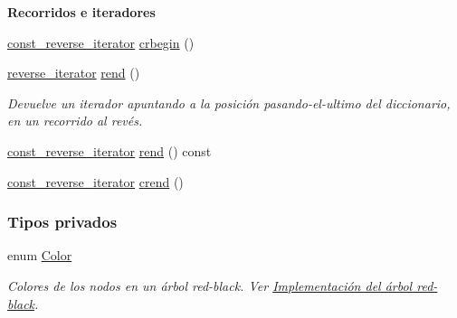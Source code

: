 \begin{Indent}{\bf Recorridos e iteradores}
\begin{DoxyCompactItemize}
\item 
\hyperlink{classaed2_1_1map_aed66a216549d13078a3ea6978ea0b768_aed66a216549d13078a3ea6978ea0b768}{const\-\_\-reverse\-\_\-iterator} \hyperlink{classaed2_1_1map_a6ad62765a2b2e00247b9e35a7542b448_a6ad62765a2b2e00247b9e35a7542b448}{crbegin} ()
\item 
\hyperlink{classaed2_1_1map_a8e6a592062260177fd73b2f9897b1dd5_a8e6a592062260177fd73b2f9897b1dd5}{reverse\-\_\-iterator} \hyperlink{classaed2_1_1map_a277f03b4f4b6b98879e4e4921081801f_a277f03b4f4b6b98879e4e4921081801f}{rend} ()
\begin{DoxyCompactList}\small\item\em Devuelve un iterador apuntando a la posición pasando-\/el-\/ultimo del diccionario, en un recorrido al revés. \end{DoxyCompactList}\item 
\hyperlink{classaed2_1_1map_aed66a216549d13078a3ea6978ea0b768_aed66a216549d13078a3ea6978ea0b768}{const\-\_\-reverse\-\_\-iterator} \hyperlink{classaed2_1_1map_aafce6e53c53c460897613747fec89f9d_aafce6e53c53c460897613747fec89f9d}{rend} () const 
\item 
\hyperlink{classaed2_1_1map_aed66a216549d13078a3ea6978ea0b768_aed66a216549d13078a3ea6978ea0b768}{const\-\_\-reverse\-\_\-iterator} \hyperlink{classaed2_1_1map_a40933b2efe1cb479de9195ea947244d1_a40933b2efe1cb479de9195ea947244d1}{crend} ()
\end{DoxyCompactItemize}
\end{Indent}
\subsubsection*{Tipos privados}
\begin{DoxyCompactItemize}
\item 
enum \hyperlink{classaed2_1_1map_a6d62a415a4b9d320b30cada4ebcf9f5b_a6d62a415a4b9d320b30cada4ebcf9f5b}{Color} 
\begin{DoxyCompactList}\small\item\em Colores de los nodos en un árbol red-\/black. Ver \hyperlink{Implementacion}{Implementación del árbol red-\/black}. \end{DoxyCompactList}\end{DoxyCompactItemize}
